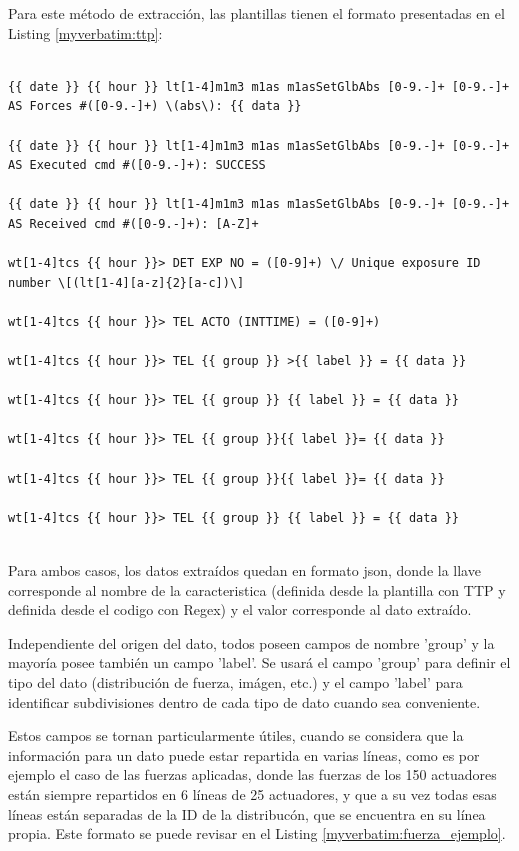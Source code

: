 \begin{enumerate}
\begin{enumerate}
    Para este método de extracción, las plantillas tienen el formato presentadas en el Listing \ref{myverbatim:ttp}:

    \begin{listing}[!ht]
        \caption{\label{myverbatim:ttp} Plantillas TTP}
        \begin{verbatim}

{{ date }} {{ hour }} lt[1-4]m1m3 m1as m1asSetGlbAbs [0-9.-]+ [0-9.-]+ AS Forces #([0-9.-]+) \(abs\): {{ data }}

{{ date }} {{ hour }} lt[1-4]m1m3 m1as m1asSetGlbAbs [0-9.-]+ [0-9.-]+ AS Executed cmd #([0-9.-]+): SUCCESS

{{ date }} {{ hour }} lt[1-4]m1m3 m1as m1asSetGlbAbs [0-9.-]+ [0-9.-]+ AS Received cmd #([0-9.-]+): [A-Z]+

wt[1-4]tcs {{ hour }}> DET EXP NO = ([0-9]+) \/ Unique exposure ID number \[(lt[1-4][a-z]{2}[a-c])\]

wt[1-4]tcs {{ hour }}> TEL ACTO (INTTIME) = ([0-9]+)

wt[1-4]tcs {{ hour }}> TEL {{ group }} >{{ label }} = {{ data }}

wt[1-4]tcs {{ hour }}> TEL {{ group }} {{ label }} = {{ data }}

wt[1-4]tcs {{ hour }}> TEL {{ group }}{{ label }}= {{ data }}

wt[1-4]tcs {{ hour }}> TEL {{ group }}{{ label }}= {{ data }}

wt[1-4]tcs {{ hour }}> TEL {{ group }} {{ label }} = {{ data }}
    
        \end{verbatim}
    \end{listing}

\end{enumerate}

Para ambos casos, los datos extraídos quedan en formato json, donde la llave corresponde al nombre de la caracteristica (definida desde la plantilla con TTP y definida desde el codigo con Regex) y el valor corresponde al dato extraído.

Independiente del origen del dato, todos poseen campos de nombre 'group' y la mayoría posee también un campo 'label'. Se usará el campo 'group' para definir el tipo del dato (distribución de fuerza, imágen, etc.) y el campo 'label' para identificar subdivisiones dentro de cada tipo de dato cuando sea conveniente.

Estos campos se tornan particularmente útiles, cuando se considera que la información para un dato puede estar repartida en varias líneas, como es por ejemplo el caso de las fuerzas aplicadas, donde las fuerzas de los 150 actuadores están siempre repartidos en 6 líneas de 25 actuadores, y que a su vez todas esas líneas están separadas de la ID de la distribucón, que se encuentra en su línea propia. Este formato se puede revisar en el Listing \ref{myverbatim:fuerza_ejemplo}.


\end{enumerate}
